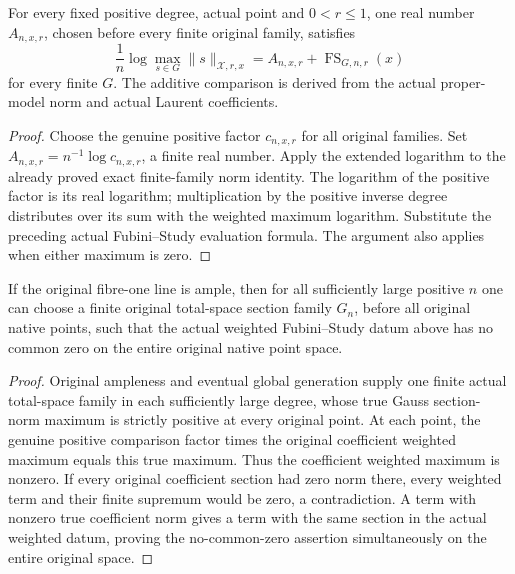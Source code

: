 \begin{theorem}\label{thm:native-tc-original-weighted-fs-total-log}
\leanok
For every fixed positive degree, actual point and $0<r\leq1$, one
real number $A_{n,x,r}$, chosen before every finite original family,
satisfies
\[
 \frac1n\log\max_{s\in G}\lVert s\rVert_{\mathcal X,r,x}
 =A_{n,x,r}+\operatorname{FS}_{G,n,r}(x)
\]
for every finite $G$. The additive comparison is derived from the
actual proper-model norm and actual Laurent coefficients.
\end{theorem}
\begin{proof}
Choose the genuine positive factor $c_{n,x,r}$ for all original
families. Set $A_{n,x,r}=n^{-1}\log c_{n,x,r}$, a finite real number.
Apply the extended logarithm to the already proved exact finite-family
norm identity. The logarithm of the positive factor is its real
logarithm; multiplication by the positive inverse degree distributes
over its sum with the weighted maximum logarithm. Substitute the
preceding actual Fubini--Study evaluation formula. The argument also
applies when either maximum is zero.
\end{proof}

\begin{theorem}\label{thm:native-tc-original-weighted-fs-no-common-zero}
\leanok
If the original fibre-one line is ample, then for all sufficiently
large positive $n$ one can choose a finite original total-space
section family $G_n$, before all original native points, such that
the actual weighted Fubini--Study datum above has no common zero
on the entire original native point space.
\end{theorem}
\begin{proof}
Original ampleness and eventual global generation supply one finite
actual total-space family in each sufficiently large degree, whose
true Gauss section-norm maximum is strictly positive at every original
point. At each point, the genuine positive comparison factor times
the original coefficient weighted maximum equals this true maximum.
Thus the coefficient weighted maximum is nonzero. If every original
coefficient section had zero norm there, every weighted term and their
finite supremum would be zero, a contradiction. A term with nonzero
true coefficient norm gives a term with the same section in the actual
weighted datum, proving the no-common-zero assertion simultaneously
on the entire original space.
\end{proof}

